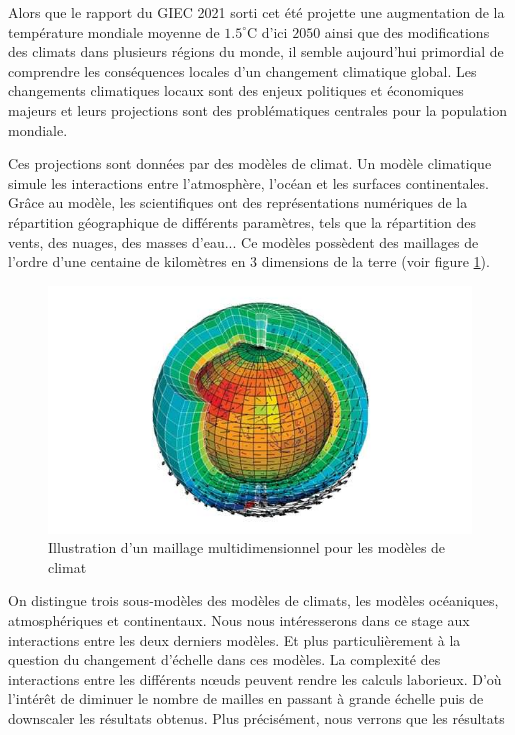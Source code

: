 \documentclass[a4paper,11pt]{article}
\numberwithin{equation}{section}
\begin{document}
Alors que le rapport du GIEC 2021 sorti cet été projette une augmentation de la température mondiale moyenne de $1.5^{\circ}$C d'ici $2050$ ainsi que des modifications des climats dans plusieurs régions du monde, il semble aujourd'hui primordial de comprendre les conséquences locales d'un changement climatique global. Les changements climatiques locaux sont des enjeux politiques et économiques majeurs et leurs projections sont des problématiques centrales pour la population mondiale.

Ces projections sont données par des modèles de climat.
Un modèle climatique simule les interactions entre l'atmosphère, l'océan et les surfaces continentales. Grâce au modèle, les scientifiques ont des représentations numériques de la répartition géographique de différents paramètres, tels que la répartition des vents, des nuages, des masses d'eau... Ce modèles possèdent des maillages de l'ordre d'une centaine de kilomètres en $3$ dimensions de la terre (voir figure \ref{fig-maillage multidimentionnel terre}).

\begin{figure}[H]
	\begin{center}
		\includegraphics[scale=0.4]{maillage_terre.jpg}
	\end{center}
	\caption{Illustration d'un maillage multidimensionnel pour les modèles de climat}
	\label{fig-maillage multidimentionnel terre}
\end{figure}

On distingue trois sous-modèles des modèles de climats, les modèles océaniques, atmosphériques et continentaux. Nous nous intéresserons dans ce stage aux interactions entre les deux derniers modèles. Et plus particulièrement à la question du changement d'échelle dans ces modèles. La complexité des interactions entre les différents nœuds peuvent rendre les calculs laborieux. D'où l'intérêt de diminuer le nombre de mailles en passant à grande échelle puis de downscaler les résultats obtenus. Plus précisément, nous verrons que les résultats 
\end{document}
